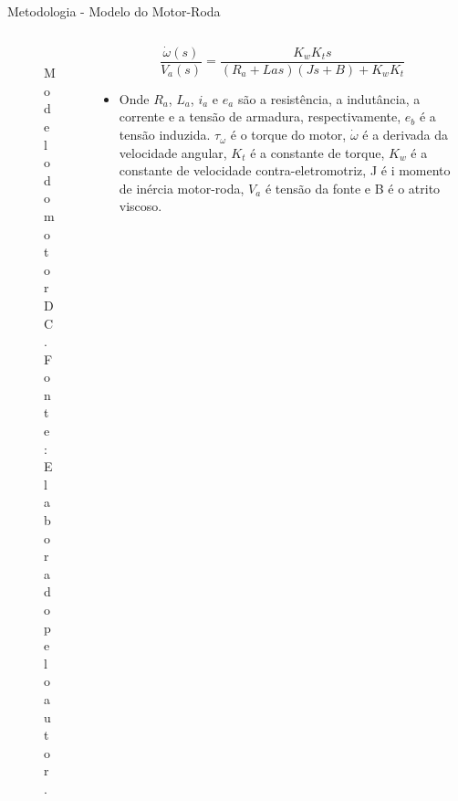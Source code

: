 \documentclass{beamer}
\begin{document}
\begin{frame}{Metodologia - Modelo do Motor-Roda}

\begin{columns}
    \begin{column}{0.40\textwidth}
        \begin{figure}[HT]
		\begin{center}
		\captionsetup{justification=centering}
        \includegraphics[scale=.4]{../metodologia/img/modelo_motor_dc}
        \caption{Modelo do motor DC. \newline
        		 Fonte: Elaborado pelo autor.}
		\label{FIG_ADAPTATIVO}
        \end{center}
	\end{figure}
    \end{column}
    \begin{column}{0.60\textwidth}

	\begin{equation}\label{eq:motor_accel}
	  	\frac{\dot{\omega}(s)}{V_a(s)} = \frac{K_wK_t s}{(R_a+ Las)(Js+B)+K_wK_t}  
	\end{equation}
	\begin{itemize}
    	\justifying
    	\item Onde $R_a$, $L_a$, $i_a$ e $e_a$ são a resistência, a indutância, a corrente e a tensão de armadura, respectivamente, $e_b$ é a tensão induzida. $\tau_{\omega}$ é o torque do motor, $\dot{\omega}$ é a derivada da velocidade angular, $K_t$ é a constante de torque, $K_w$ é a constante de velocidade contra-eletromotriz, J é i momento de inércia motor-roda, $V_a$ é tensão da fonte e B é o atrito viscoso.
    \end{itemize}
    \end{column}
\end{columns}
\end{frame}
\end{document}
